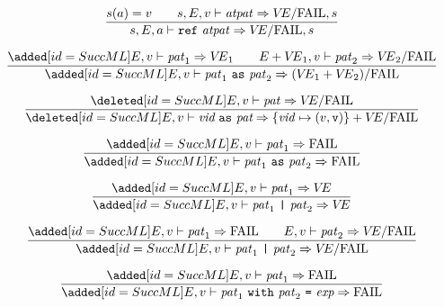 \replacement{\theidstatus}{\begin{equation} 
\label{exconpat-dyn-rule2}
\frac{\E(\longexn)=\e\qquad\V\notin\{\e\}\times\Val}
     {\E,\V\ts\exconpat\ra\FAIL}
\end{equation}}{\begin{equation} 
\label{exconpat-dyn-rule2}
\frac{\E(\longvid)=(\e,\ise)\qquad\V\notin\{\e\}\times\Val}
     {\E,\V\ts\vidpat\ra\FAIL}
\end{equation}}
\oldpagebreak
\begin{equation}	%
\frac{\s(\A)=\V\qquad\s,\E,\V\ts\atpat\ra\VE/\fail,\s}
     {\s,\E,\A\ts\REF\ \atpat\ra \VE/\fail,\s}\index{57.0}
\end{equation}


\begin{equation}	%
\frac{\ADD{\E,\V\ts\pat_1\ra\VE_1 \qquad \plusmap{\E}{\VE_1},\V\ts\pat_2\ra\VE_2/\fail}}
     {\ADD{\E,\V\ts\aspat\ra(\VE_1+\VE_2)/\fail}}
\end{equation}

\SameEqn
\begin{equation}	%
\frac{\CUT{\E,\V\ts\pat\ra\VE/\fail}}
     {\CUT{\E,\V\ts\layeredvidpata\ra\{\vid\mapsto(\V,\isv)\}+\VE/\fail}}
\end{equation}
\NextEqn

\BeginNewEqns
\begin{equation}	%
\frac{\ADD{\E,\V\ts\pat_1\ra\fail}}
     {\ADD{\E,\V\ts\aspat\ra\fail}}
\end{equation}

\begin{equation}	%
\frac{\ADD{\E,\V\ts\pat_1\ra\VE}}
     {\ADD{\E,\V\ts\orpat\ra\VE}}
\end{equation}

\begin{equation}	%
\frac{\ADD{\E,\V\ts\pat_1\ra\fail \qquad \E,\V\ts\pat_2\ra\VE/\fail}}
     {\ADD{\E,\V\ts\orpat\ra\VE/\fail}}
\end{equation}

\begin{equation}	%
\frac{\ADD{\E,\V\ts\pat_1\ra\fail}}
     {\ADD{\E,\V\ts\nestedpat\ra\fail}}
\end{equation}

